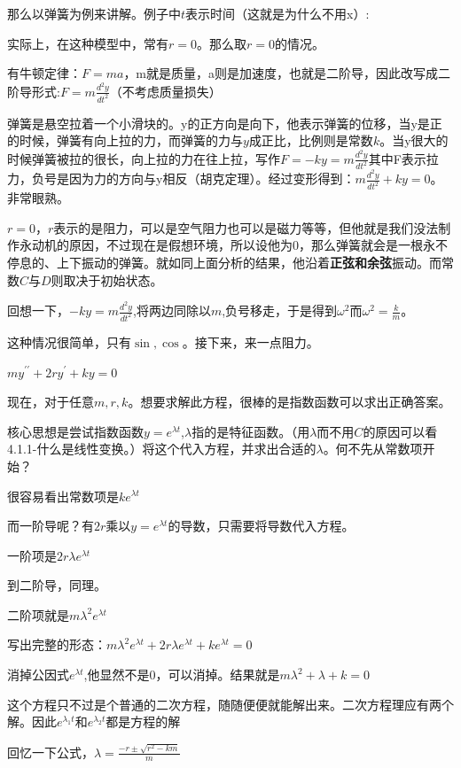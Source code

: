 \documentclass[UTF8]{ctexbook}
\newcommand{\derivative}{^\prime}
\newcommand{\doubleDerivative}{^{\prime\prime}}
\begin{document}
{{{{那么以弹簧为例来讲解。例子中$t$表示时间（这就是为什么不用x）:

实际上，在这种模型中，常有$r = 0$。那么取$ r = 0$的情况。

有牛顿定律：$F = ma$，m就是质量，a则是加速度，也就是二阶导，因此改写成二阶导形式:$F = m\frac{d^2y}{dt^2}$（不考虑质量损失）

弹簧是悬空拉着一个小滑块的。y的正方向是向下，他表示弹簧的位移，当y是正的时候，弹簧有向上拉的力，而弹簧的力与$y$成正比，比例则是常数$k$。当y很大的时候弹簧被拉的很长，向上拉的力在往上拉，写作$F = -ky = m\frac{d^2y}{dt^2}$其中F表示拉力，负号是因为力的方向与y相反（胡克定理）。经过变形得到：$m\frac{d^2y}{dt^2} + ky = 0$。非常眼熟。

$r = 0$，$r$表示的是阻力，可以是空气阻力也可以是磁力等等，但他就是我们没法制作永动机的原因，不过现在是假想环境，所以设他为0，那么弹簧就会是一根永不停息的、上下振动的弹簧。就如同上面分析的结果，他沿着{\bfseries 正弦和余弦}振动。而常数$C$与$D$则取决于初始状态。

回想一下，$-ky = m\frac{d^2y}{dt^2}$,将两边同除以$m$,负号移走，于是得到$\omega^2$而$\omega^2 = \frac{k}{m}$。

这种情况很简单，只有$\sin , \cos$。接下来，来一点阻力。

$my\doubleDerivative + 2ry\derivative + ky = 0$

现在，对于任意$m,r,k$。想要求解此方程，很棒的是指数函数可以求出正确答案。

核心思想是尝试指数函数$y = e^{\lambda t}$,$\lambda$指的是特征函数。（用$\lambda$而不用$C$的原因可以看4.1.1-什么是线性变换。）将这个代入方程，并求出合适的$\lambda$。何不先从常数项开始？

很容易看出常数项是$ke^{\lambda t}$

而一阶导呢？有$2r$乘以$y = e^{\lambda t}$的导数，只需要将导数代入方程。

一阶项是$2r\lambda e^{\lambda t}$

到二阶导，同理。

二阶项就是$m\lambda^2e^{\lambda t}$

写出完整的形态：$m\lambda^2e^{\lambda t} + 2r\lambda e^{\lambda t} + ke^{\lambda t} = 0$

消掉公因式$e^{\lambda t}$,他显然不是0，可以消掉。结果就是$m\lambda^2 + \lambda + k= 0$

这个方程只不过是个普通的二次方程，随随便便就能解出来。二次方程理应有两个解。因此$e^{\lambda_1 t}$和$e^{\lambda_2 t}$都是方程的解

回忆一下公式，$\lambda = \frac{-r \pm \sqrt{r^2 - km}}{m}$

}}}}
\end{document}
